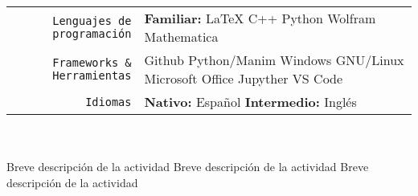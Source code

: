 \documentclass[
    10pt,
    A4,
    spanish,
    draft = false,
    twoside = false,
]{article}
\begin{document}
	\tab \begin{tabular}{r p{}}
		\texttt{\large Lenguajes de programación} & \textbf{Familiar:} LaTeX \cvContactSep C++ \cvContactSep Python \cvContactSep Wolfram Mathematica\\
		\texttt{\large Frameworks \& Herramientas} & Github \cvContactSep Python/Manim \cvContactSep Windows \cvContactSep GNU/Linux \cvContactSep Microsoft Office \cvContactSep Jupyther \cvContactSep VS Code\\
		\texttt{\large Idiomas} & \textbf{Nativo:} Español \cvContactSep \textbf{Intermedio:} Inglés \\
	\end{tabular}\\~\\
	{Breve descripción de la actividad}
	{Breve descripción de la actividad}
	{Breve descripción de la actividad}
	
\end{document}
